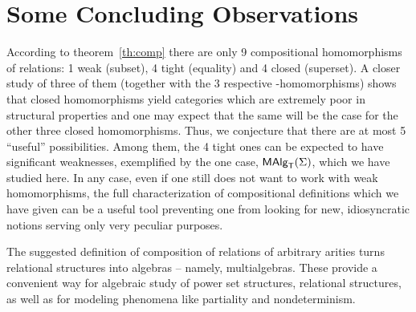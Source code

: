 \documentclass[10pt]{article}
\begin{document}


\section{Some Concluding Observations}

According to theorem~\ref{th:comp} there are only 9 compositional
homomorphisms of relations: 1 weak (subset), 4 tight (equality) and 4 closed (superset).
A closer study of three of them (together with the 3 respective \PS-homomorphisms) 
shows that closed homomorphisms yield
categories which are extremely poor in structural properties and one
may expect that the same will be the case for the other three
closed homomorphisms. Thus, we conjecture that there are at most
5 ``useful'' possibilities. Among them, the 4 tight ones can be expected
to have significant weaknesses, exemplified by the one case, $\mbox{\rm\sf MAlg}_{\sf T}(\Sigma)$, which we
have studied here. 
In any case, even if one still does not want to work with weak homomorphisms, 
the full characterization of compositional definitions which we have given
 can be a useful tool preventing one from looking for new, idiosyncratic
notions serving only very peculiar purposes.


The suggested definition of composition of relations of arbitrary
arities turns relational structures into algebras -- namely, multialgebras.
These provide a convenient way for algebraic study of power set structures, 
relational structures, as well as for modeling phenomena like
partiality and nondeterminism.
\end{document}
